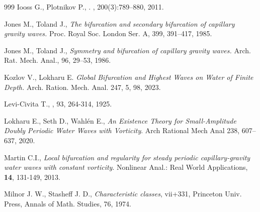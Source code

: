 \documentclass[11pt,a4paper,reqno]{article}
\numberwithin{equation}{section}
\theoremstyle{definition}
\begin{document}
\begin{footnotesize}
\begin{thebibliography}{999}
Iooss G., Plotnikov P.,
. 
, 200(3):789--880, 2011.



    Jones M., Toland J., {\it The bifurcation and secondary bifurcation of capillary gravity waves.} Proc. Royal Soc. London Ser. A, 399, 391–417, 1985. 

    Jones M., Toland J., {\it Symmetry and bifurcation of capillary gravity waves.} Arch. Rat. Mech. Anal., 96, 29–53, 1986. 


    Kozlov V., Lokharu  E. {\it Global Bifurcation and Highest Waves on Water of Finite Depth.} Arch. Ration. Mech. Anal. 247, 5, 98, 2023.

    Levi-Civita  T., 
    , 93, 264-314, 1925.

    Lokharu E.,  Seth D.,  Wahlén E., {\it An Existence Theory for Small-Amplitude Doubly Periodic Water Waves with Vorticity}. Arch Rational Mech Anal 238, 607–637, 2020.



        


	Martin C.I., \emph{Local bifurcation and regularity for steady periodic capillary-gravity water waves with constant vorticity}. Nonlinear Anal.: Real World Applications, \textbf{14}, 131-149, 2013.



Milnor J. W., Stasheff J. D.,
{\it Characteristic classes}, 
vii+331, Princeton Univ. Press,
Annals of Math. Studies,  76,
1974.



\end{thebibliography}
\end{footnotesize}
\end{document}

